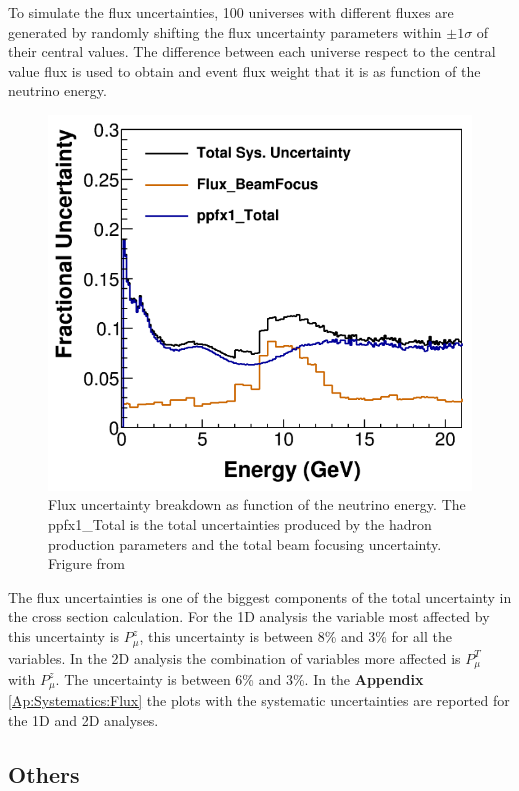 To simulate the flux uncertainties, 100 universes with different fluxes are generated by randomly shifting the flux uncertainty parameters within $\pm1\sigma$ of their central values. The difference between each universe respect to the central value flux is used to obtain and event flux weight that it is as function of the neutrino energy. 

\begin{figure}[!htb]
    \centering
    \includegraphics[scale=0.4]{Figures/Chapter6/BeamUncertainties.png}
    \caption{Flux uncertainty breakdown as function of the neutrino energy. The ppfx1\_Total is the total uncertainties produced by the hadron production parameters and the total beam focusing uncertainty. Frigure from \cite{BenThesis}}
    \label{fig:Systematics:FluxUncertainties}
\end{figure} 

The flux uncertainties is one of the biggest components of the total uncertainty in the cross section calculation. For the 1D analysis the variable most affected by this uncertainty is $P^z_\mu$, this uncertainty is between 8\% and 3\% for all the variables. In the 2D analysis the combination of variables more affected is $P^T_\mu$ with $P^z_\mu$. The uncertainty is between 6\% and 3\%. In the \textbf{Appendix} \ref{Ap:Systematics:Flux} the plots with the systematic uncertainties are reported for the 1D and 2D analyses. 

\subsection{Others}
\label{Cap:ErrorAnalysis:SystematicUnc:Others}

